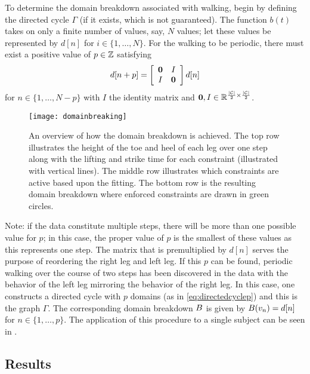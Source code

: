 To determine the domain breakdown associated with walking, begin by defining the
directed cycle $\Gamma$ (if it exists, which is not guaranteed).
%
The function $b(t)$ takes on only a finite number of values, say, $N$ values;
%
let these values be represented by $d[n]$ for $i \in \{1, \ldots, N\}$.
%
For the walking to be periodic, there must exist a positive value of $p \in \mathbb{Z}$
satisfying
\begin{align}
  \label{eq:dstep}
  d[n + p] =
  \left[\begin{array}{c c}
      {\mathbf 0} & I\\
      I & {\mathbf 0}
    \end{array}\right] d[n]
\end{align}
for $n \in \{1, \ldots, N-p\}$ with $I$ the identity matrix and ${\mathbf 0}, I
\in \mathbb{R}^{\frac{|\mathcal{C}|}{2} \times \frac{|\mathcal{C}|}{2}}$.
%
\begin{figure}[t!]
  \centering
  \texttt{[image: domainbreaking]}
  \caption[An overview of how the domain breakdown is achieved.]{An overview of
    how the domain breakdown is achieved.
    The top row illustrates the height of the toe and heel of each leg over one
    step along with the lifting and strike time for each constraint (illustrated
    with vertical lines).
    The middle row illustrates which constraints are active based upon the
    fitting.
    The bottom row is the resulting domain breakdown where enforced constraints
    are drawn in green circles.}
  \label{fig:domainbreakdown}
\end{figure}
%
Note: if the data constitute multiple steps, there will be more than one
possible value for $p$;
%
in this case, the proper value of $p$ is the smallest of these values as this
represents one step.
%
The matrix that is premultiplied by $d[n]$ serves the purpose of reordering the
right leg and left leg.
%
If this $p$ can be found, periodic walking over the course of two steps has been
discovered in the data with the behavior of the left leg mirroring the behavior
of the right leg.
%
In this case, one constructs a directed cycle with $p$ domains (as in
\eqref{eq:directedcyclep}) and this is the graph $\Gamma$.
%
The corresponding domain breakdown $B$ is given by $B(v_{n}) = d[n]$ for $n
\in \{1, \ldots, p\}$.
%
The application of this procedure to a single subject can be seen in
.


\subsection{Results}

